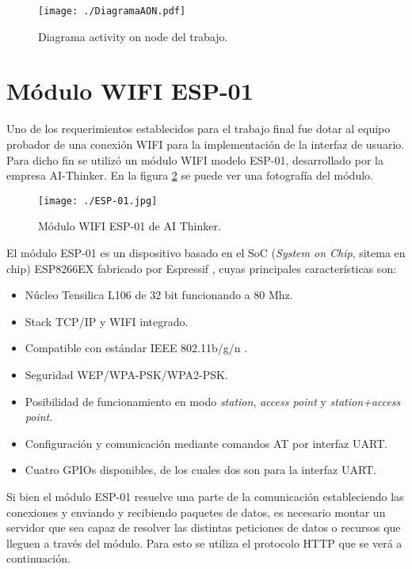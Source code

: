 \begin{figure}[H]
	\centering
	\texttt{[image: ./DiagramaAON.pdf]}
	\caption{Diagrama activity on node del trabajo.}
	\label{fig:AON}
\end{figure}

\section{Módulo WIFI ESP-01}
Uno de los requerimientos establecidos para el trabajo final fue dotar al equipo probador de una conexión WIFI para la implementación de la interfaz de usuario. Para dicho fin se utilizó un módulo WIFI modelo ESP-01, desarrollado por la empresa AI-Thinker. En la figura \ref{fig:ESP01} se puede ver una fotografía del módulo.

\begin{figure}[H]
	\centering
	\texttt{[image: ./ESP-01.jpg]}
	\caption{Módulo WIFI ESP-01 de AI Thinker.\protect\footnotemark}
	\label{fig:ESP01}
\end{figure}


El módulo ESP-01 es un dispositivo basado en el SoC (\emph{System on Chip}, sitema en chip) ESP8266EX fabricado por Espressif \citep{ESP01}, cuyas principales características son:
\begin{itemize}
	\item Núcleo Tensilica L106 de 32 bit funcionando a 80 Mhz.
	\item Stack TCP/IP y WIFI integrado.
	\item Compatible con estándar IEEE 802.11b/g/n .
	\item Seguridad WEP/WPA-PSK/WPA2-PSK.
	\item Posibilidad de funcionamiento en modo \emph{station}, \emph{access point} y \emph{station+access point}.
	\item Configuración y comunicación mediante comandos AT por interfaz UART.
	\item Cuatro GPIOs disponibles, de los cuales dos son para la interfaz UART.

\end{itemize}

Si bien el módulo ESP-01 resuelve una parte de la comunicación estableciendo las conexiones y enviando y recibiendo paquetes de datos, es necesario montar un servidor que sea capaz de resolver las distintas peticiones de datos o recursos que lleguen a través del módulo. Para esto se utiliza el protocolo HTTP que se verá a continuación. 

